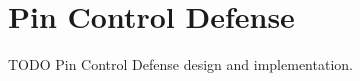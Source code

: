 \chapter{Pin Control Defense}
\label{chap:defense}

TODO Pin Control Defense design and implementation.

